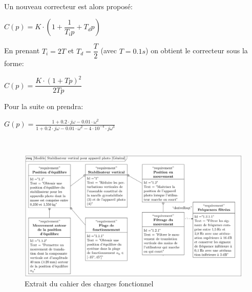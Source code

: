 ~\

Un nouveau correcteur est alors proposé:
\begin{center}
$C(p)=K\cdot\left(1+\dfrac{1}{T_ip}+T_dp\right)$
\end{center}

En prenant $T_i=2T$ et $T_d=\dfrac{T}{2}$ (avec $T=0.1s$) on obtient le correcteur sous la forme:
\begin{center}
$C(p)=\dfrac{K\cdot(1+Tp)^2}{2Tp}$
\end{center}


\newpage

Pour la suite on prendra:
\begin{center}
$G(p)=\frac{1+0.2\cdot j\omega-0.01\cdot \omega^2}{1+0.2\cdot j\omega-0.01\cdot \omega^2-4\cdot 10^{-4}\cdot j\omega^3}$
\end{center}




~\

\begin{figure}[ht!]
\begin{center}
 \includegraphics[width=0.8\linewidth]{img/fig18}
\end{center}
\caption{Extrait du cahier des charges fonctionnel}
\label{fig18}
\end{figure}

